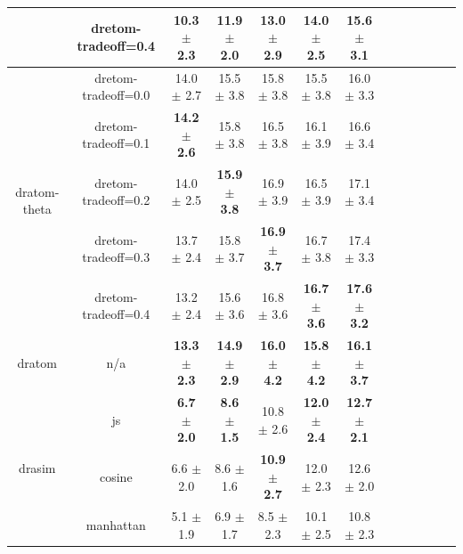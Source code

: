 \begin{table}
\begin{tabular}{ccccccccccccc}
                                                                      & \gls{dretom-tradeoff}=0.4 &            10.3 $\pm$ 2.3 &            11.9 $\pm$ 2.0 &            13.0 $\pm$ 2.9 &            14.0 $\pm$ 2.5 &            15.6 $\pm$ 3.1 \\
    \midrule
    \multirow{5}{1.5cm}{\gls{dratom-theta}} & \gls{dretom-tradeoff}=0.0 &            14.0 $\pm$ 2.7 &            15.5 $\pm$ 3.8 &            15.8 $\pm$ 3.8 &            15.5 $\pm$ 3.8 &            16.0 $\pm$ 3.3 \\
                                                                      & \gls{dretom-tradeoff}=0.1 &  \bfseries 14.2 $\pm$ 2.6 &            15.8 $\pm$ 3.8 &            16.5 $\pm$ 3.8 &            16.1 $\pm$ 3.9 &            16.6 $\pm$ 3.4 \\
                                                                      & \gls{dretom-tradeoff}=0.2 &            14.0 $\pm$ 2.5 &  \bfseries 15.9 $\pm$ 3.8 &            16.9 $\pm$ 3.9 &            16.5 $\pm$ 3.9 &            17.1 $\pm$ 3.4 \\
                                                                      & \gls{dretom-tradeoff}=0.3 &            13.7 $\pm$ 2.4 &            15.8 $\pm$ 3.7 &  \bfseries 16.9 $\pm$ 3.7 &            16.7 $\pm$ 3.8 &            17.4 $\pm$ 3.3 \\
                                                                      & \gls{dretom-tradeoff}=0.4 &            13.2 $\pm$ 2.4 &            15.6 $\pm$ 3.6 &            16.8 $\pm$ 3.6 &  \bfseries 16.7 $\pm$ 3.6 &  \bfseries 17.6 $\pm$ 3.2 \\
    \midrule
    \multirow{1}{1.5cm}{\gls{dratom}} & n/a &  \bfseries 13.3 $\pm$ 2.3 &  \bfseries 14.9 $\pm$ 2.9 &  \bfseries 16.0 $\pm$ 4.2 &  \bfseries 15.8 $\pm$ 4.2 &  \bfseries 16.1 $\pm$ 3.7 \\
    \midrule
    \multirow{3}{1.5cm}{\gls{drasim}} & \gls{js} &   \bfseries 6.7 $\pm$ 2.0 &   \bfseries 8.6 $\pm$ 1.5 &            10.8 $\pm$ 2.6 &  \bfseries 12.0 $\pm$ 2.4 &  \bfseries 12.7 $\pm$ 2.1 \\
                                                                      & \gls{cosine} &             6.6 $\pm$ 2.0 &             8.6 $\pm$ 1.6 &  \bfseries 10.9 $\pm$ 2.7 &            12.0 $\pm$ 2.3 &            12.6 $\pm$ 2.0 \\
                                                                      & \gls{manhattan} &             5.1 $\pm$ 1.9 &             6.9 $\pm$ 1.7 &             8.5 $\pm$ 2.3 &            10.1 $\pm$ 2.5 &            10.8 $\pm$ 2.3 \\
    \bottomrule
    \end{tabular}
\end{table}
